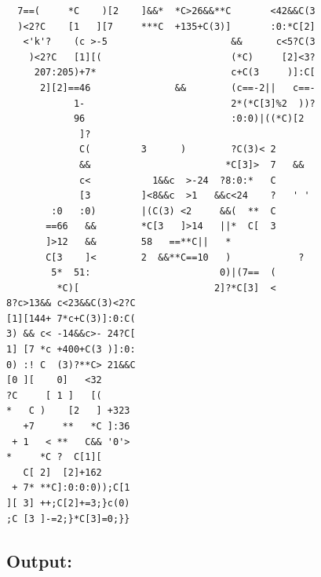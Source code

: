 \documentclass[11pt]{article}
\begin{document}
\begin{lstlisting}
  7==(     *C    )[2    ]&&*  *C>26&&**C       <42&&C(3
  )<2?C    [1   ][7     ***C  +135+C(3)]       :0:*C[2]
   <'k'?    (c >-5                      &&      c<5?C(3
    )<2?C   [1][(                       (*C)     [2]<3?
     207:205)+7*                        c+C(3     )]:C[
      2][2]==46               &&        (c==-2||   c==-
            1-                          2*(*C[3]%2  ))?
            96                          :0:0)|((*C)[2
             ]?
             C(         3      )        ?C(3)< 2
             &&                        *C[3]>  7   &&
             c<           1&&c  >-24  ?8:0:*   C
             [3         ]<8&&c  >1   &&c<24    ?   ' '
        :0   :0)        |(C(3) <2     &&(  **  C
       ==66   &&        *C[3   ]>14   ||*  C[  3
       ]>12   &&        58   ==**C||   *
       C[3    ]<        2  &&**C==10   )            ?
        5*  51:                       0)|(7==  (
         *C)[                        2]?*C[3]  <
8?c>13&& c<23&&C(3)<2?C
[1][144+ 7*c+C(3)]:0:C(
3) && c< -14&&c>- 24?C[
1] [7 *c +400+C(3 )]:0:
0) :! C  (3)?**C> 21&&C
[0 ][    0]   <32
?C     [ 1 ]   [(
*   C )    [2   ] +323
   +7     **   *C ]:36
 + 1   < **   C&& '0'>
*     *C ?  C[1][
   C[ 2]  [2]+162
 + 7* **C]:0:0:0));C[1
][ 3] ++;C[2]+=3;}c(0)
;C [3 ]-=2;}*C[3]=0;}}

\end{lstlisting}

\subsection*{Output:}
\end{document}
